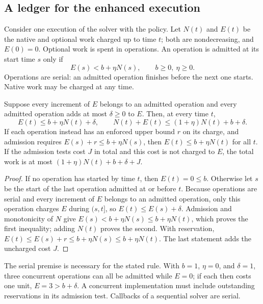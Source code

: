 \subsection{A ledger for the enhanced execution}\label{sec:effort-ledger}

Consider one execution of the solver with the policy. Let $N(t)$ and $E(t)$
be the native and optional work charged up to time $t$; both are
nondecreasing, and $E(0)=0$. Optional work is spent in operations. An
operation is admitted at its start time $s$ only if
\begin{equation}\label{eq:admission}
 E(s)<b+\eta N(s),\qquad b\ge0,\ \eta\ge0 .
\end{equation}
Operations are serial: an admitted operation finishes before the next one
starts. Native work may be charged at any time.

\begin{proposition}[Ledger]\label{prop:ledger}
Suppose every increment of $E$ belongs to an admitted operation and every
admitted operation adds at most $\delta\ge0$ to $E$. Then, at every time $t$,
\begin{equation}\label{eq:ledger}
 E(t)\le b+\eta N(t)+\delta,\qquad
 N(t)+E(t)\le(1+\eta)N(t)+b+\delta .
\end{equation}
If each operation instead has an enforced upper bound $r$ on its charge, and
admission requires $E(s)+r\le b+\eta N(s)$, then $E(t)\le b+\eta N(t)$ for all
$t$. If the admission tests cost $J$ in total and this cost is not charged to
$E$, the total work is at most $(1+\eta)N(t)+b+\delta+J$.
\end{proposition}

\begin{proof}
If no operation has started by time $t$, then $E(t)=0\le b$. Otherwise let $s$
be the start of the last operation admitted at or before $t$. Because
operations are serial and every increment of $E$ belongs to an admitted
operation, only this operation charges $E$ during $(s,t]$, so
$E(t)\le E(s)+\delta$. Admission and monotonicity of $N$ give
$E(s)<b+\eta N(s)\le b+\eta N(t)$, which proves the first inequality; adding
$N(t)$ proves the second. With reservation, $E(t)\le E(s)+r\le b+\eta N(s)\le
b+\eta N(t)$. The last statement adds the uncharged cost $J$.
\end{proof}

The serial premise is necessary for the stated rule. With $b=1$, $\eta=0$, and
$\delta=1$, three concurrent operations can all be admitted while $E=0$; if
each then costs one unit, $E=3>b+\delta$. A concurrent implementation must
include outstanding reservations in its admission test. Callbacks of a
sequential solver are serial.

